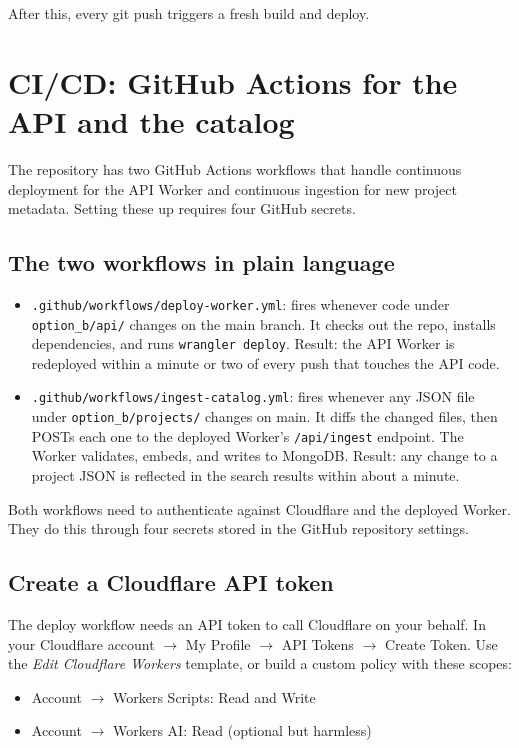 \documentclass[11pt,a4paper]{article}
\begin{document}
After this, every git push triggers a fresh build and deploy.

\section{CI/CD: GitHub Actions for the API and the catalog}

The repository has two GitHub Actions workflows that handle continuous deployment for the API Worker and continuous ingestion for new project metadata. Setting these up requires four GitHub secrets.

\subsection{The two workflows in plain language}

\begin{itemize}[leftmargin=1.5em,itemsep=4pt]
  \item \texttt{.github/workflows/deploy-worker.yml}: fires whenever code under \texttt{option\_b/api/} changes on the main branch. It checks out the repo, installs dependencies, and runs \texttt{wrangler deploy}. Result: the API Worker is redeployed within a minute or two of every push that touches the API code.
  \item \texttt{.github/workflows/ingest-catalog.yml}: fires whenever any JSON file under \texttt{option\_b/projects/} changes on main. It diffs the changed files, then POSTs each one to the deployed Worker's \texttt{/api/ingest} endpoint. The Worker validates, embeds, and writes to MongoDB. Result: any change to a project JSON is reflected in the search results within about a minute.
\end{itemize}

Both workflows need to authenticate against Cloudflare and the deployed Worker. They do this through four secrets stored in the GitHub repository settings.

\subsection{Create a Cloudflare API token}

The deploy workflow needs an API token to call Cloudflare on your behalf. In your Cloudflare account \(\rightarrow\) My Profile \(\rightarrow\) API Tokens \(\rightarrow\) Create Token. Use the \emph{Edit Cloudflare Workers} template, or build a custom policy with these scopes:

\begin{itemize}[leftmargin=1.5em,itemsep=2pt]
  \item Account \(\rightarrow\) Workers Scripts: Read and Write
  \item Account \(\rightarrow\) Workers AI: Read (optional but harmless)
\end{itemize}
\end{document}
